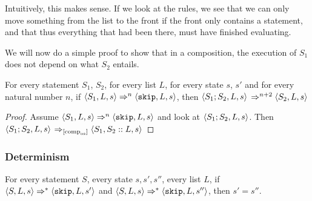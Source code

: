 Intuitively, this makes sense. If we look at the rules, we see that we can only move something from the list to the front if the front only contains a \sk statement, and that thus everything that had been there, must have finished evaluating. 

We will now do a simple proof to show that in a composition, the execution of $S_1$ does not depend on what $S_2$ entails. 

\begin{proposition}
For every statement $S_1$, $S_2$, for every list $L$, for every state $s$, $s'$ and for every natural number $n$, if $\langle S_1, L, s \rangle \Rightarrow ^{n} \langle \texttt{skip}, L, s \rangle$, then $\langle S_1;S_2, L, s \rangle$ $\Rightarrow ^{n+2} \langle S_2, L, s \rangle$
\end{proposition}

\begin{proof}
Assume $\langle S_1, L, s \rangle \Rightarrow ^{n} \langle \texttt{skip}, L, s \rangle$ and look at $\langle S_1;S_2, L, s \rangle$. Then \\$\langle S_1;S_2, L, s \rangle$ $\Rightarrow _{[\textrm{comp}_{\textrm{os}}]} \langle S_1, S_2::L, s \rangle$
\end{proof}


\subsubsection*{Determinism}

\begin{theorem}
For every statement $S$, every state $s, s', s''$, every list $L$, if $\langle S, L, s \rangle \Rightarrow ^{*} \langle \texttt{skip}, L, s' \rangle$ and $\langle S, L, s \rangle \Rightarrow ^{*} \langle \texttt{skip}, L, s'' \rangle$, then $s' = s''$.
\end{theorem}

